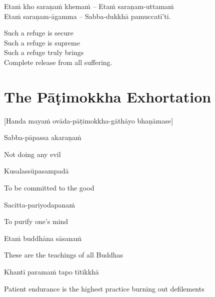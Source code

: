 Etaṁ kho saraṇaṁ khemaṁ – Etaṁ saraṇam-uttamaṁ\\
Etaṁ saraṇam-āgamma – Sabba-dukkhā pamuccatī'ti.

\begin{english}
  Such a refuge is secure\\
  Such a refuge is supreme\\
  Such a refuge truly brings\\
  Complete release from all suffering.
\end{english}

\suttaRef{[Dhp 188-192]}


\section{The Pāṭimokkha Exhortation}
\label{patimokkha-exhortation}

\begin{center}
  [Handa mayaṁ ovāda-pāṭimokkha-gāthāyo bhaṇāmase]
\end{center}

Sabba-pāpassa akaraṇaṁ

\begin{english}
  Not doing any evil
\end{english}

Kusalassūpasampadā

\begin{english}
  To be committed to the good
\end{english}

Sacitta-pariyodapanaṁ

\begin{english}
  To purify one's mind
\end{english}

Etaṁ buddhāna sāsanaṁ

\begin{english}
  These are the teachings of all Buddhas
\end{english}

Khantī paramaṁ tapo tītikkhā

\begin{english}
  Patient endurance is the highest practice burning out defilements
\end{english}

